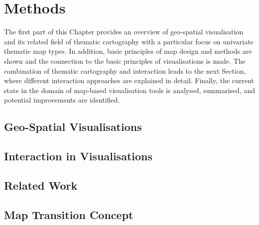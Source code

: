 \section{Methods}
\label{s:methods}
The first part of this Chapter provides an overview of geo-spatial visualisation and its related field of thematic cartography with a particular focus on univariate thematic map types. In addition, basic principles of map design and methods are shown and the connection to the basic principles of visualisations is made.
The combination of thematic cartography and interaction leads to the next Section, where different interaction approaches are explained in detail. Finally, the current state in the domain of map-based visualisation tools is analysed, summarised, and potential improvements are identified.

\subsection{Geo-Spatial Visualisations}
\label{s:cartography}


% 

\subsection{Interaction in Visualisations}
\label{s:interaction}


\subsection{Related Work}


\subsection{Map Transition Concept}
\label{s:theoretical-contrib}
